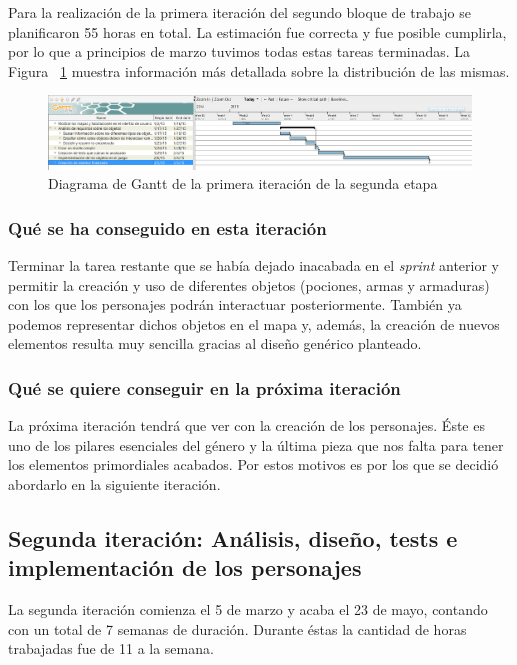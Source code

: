 \noindent Para la realización de la primera iteración del segundo bloque de trabajo se planificaron 55 horas en total. La estimación fue correcta y fue posible cumplirla, por lo que a principios de marzo tuvimos todas estas tareas terminadas. La Figura ~\ref{fig:sec2it1} muestra información más detallada sobre la distribución de las mismas.

\begin{figure}
    \includegraphics[width=\textwidth,height=\textheight,keepaspectratio]{./img/sec2it1.png}
  \caption{Diagrama de Gantt de la primera iteración de la segunda etapa}
  \label{fig:sec2it1}
\end{figure}

\subsubsection{Qué se ha conseguido en esta iteración}

Terminar la tarea restante que se había dejado inacabada en el \textit{sprint} anterior y permitir la creación y uso de diferentes objetos (pociones, armas y armaduras) con los que los personajes podrán interactuar posteriormente. También ya podemos representar dichos objetos en el mapa y, además, la creación de nuevos elementos resulta muy sencilla gracias al diseño genérico planteado.

\subsubsection{Qué se quiere conseguir en la próxima iteración}

La próxima iteración tendrá que ver con la creación de los personajes. Éste es uno de los pilares esenciales del género y la última pieza que nos falta para tener los elementos primordiales acabados. Por estos motivos es por los que se decidió abordarlo en la siguiente iteración.

\subsection{Segunda iteración: Análisis, diseño, tests e implementación de los personajes}

La segunda iteración comienza el 5 de marzo y acaba el 23 de mayo, contando con un total de 7 semanas de duración. Durante éstas la cantidad de horas trabajadas fue de 11 a la semana.

